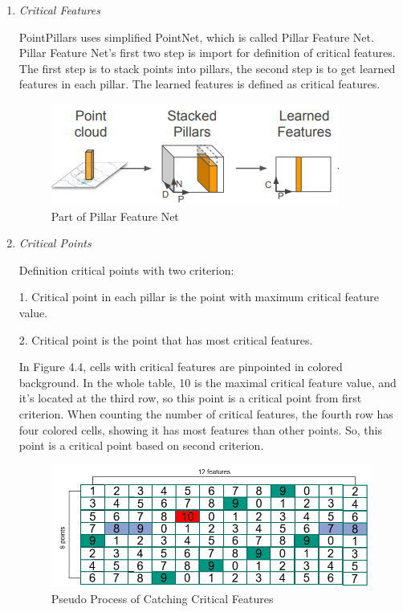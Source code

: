\begin{enumerate}
 \item \textit{Critical Features}
 
PointPillars\cite{lang_pointpillars_2019} uses simplified PointNet\cite{qi_pointnet_2017}, which is called Pillar Feature Net. Pillar Feature Net's first two step is import for definition of critical features. The first step is to stack points into pillars, the second step is to get learned features in each pillar. The learned features is defined as critical features.
\begin{figure}[!htbp]
\centering
\includegraphics[scale=1]{Graphics/Pillar Feature Net.png}
\caption{Part of Pillar Feature Net}
\label{fig:Pillar Feature Net}
\end{figure}
\item \textit{Critical Points}

Definition critical points with two criterion:

1. Critical point in each pillar is the point with maximum critical feature value. 

2. Critical point is the point that has most critical features.

In Figure 4.4, cells with critical features are pinpointed in colored background. In the whole table, 10 is the maximal critical feature value, and it's located at the third row, so this point is a critical point from first criterion. When counting the number of critical features, the fourth row has four colored cells, showing it has most features than other points. So, this point is a critical point based on second criterion.
\begin{figure}[!htbp]
\centering
\includegraphics[scale=0.5]{Graphics/Critical Points.png}
\caption{Pseudo Process of Catching Critical Features}
\label{fig:Critical Points}
\end{figure}
\end{enumerate}

